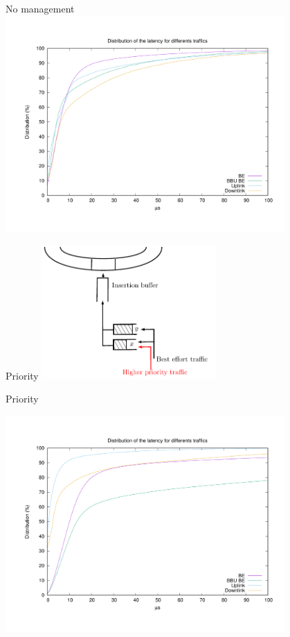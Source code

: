 \documentclass[10 pt]{beamer}
\begin{document}
\begin{frame}{No management}
\centering
\includegraphics[width=0.8\textwidth]{No_management.pdf}


\end{frame}


\begin{frame}{Priority }
\centering
\includegraphics[width=0.5\textwidth]{insertion1.pdf}


\end{frame}

\begin{frame}{Priority }

\centering
\includegraphics[width=0.8\textwidth]{Insertion_management.pdf} 

\end{frame}
\end{document}
